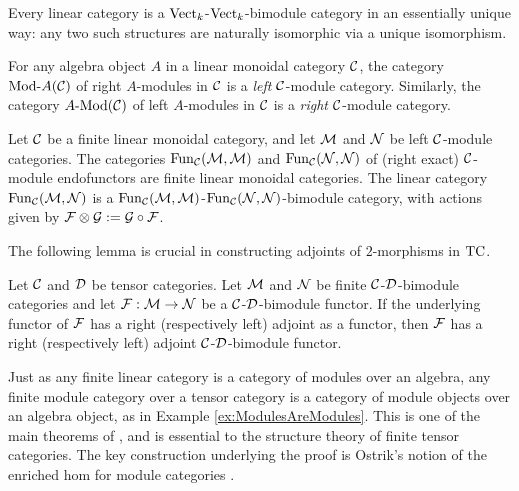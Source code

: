 \documentclass{amsart}
\begin{document}
\begin{example}
	Every linear category is a $\mathrm{Vect}_k$-$\mathrm{Vect}_k$-bimodule category in an essentially unique way: any two such structures are naturally isomorphic via a unique isomorphism.
\end{example} %

\begin{example} \label{ex:ModulesAreModules}
	For any algebra object $A$ in a linear monoidal category $\mathcal C$, the category $\Mod{}{A}(\cC)$ of right $A$-modules in $\mathcal C$ is a \emph{left} $\mathcal C$-module category.  Similarly, the category $\Mod{A}{}(\cC)$ of left $A$-modules in $\mathcal C$ is a \emph{right} $\mathcal C$-module category.
\end{example} %

\begin{example}
	Let $\mathcal C$ be a finite linear monoidal category, and let $\mathcal M$ and $\mathcal N$ be left $\mathcal C$-module categories. The categories $\operatorname{Fun}_{\mathcal C}(\mathcal M, \mathcal M)$ and $\operatorname{Fun}_{\mathcal C}(\mathcal N, \mathcal N)$ of (right exact) $\mathcal C$-module endofunctors are finite linear monoidal categories. The linear category $\operatorname{Fun}_{\mathcal C}(\mathcal M, \mathcal N)$ is a $\operatorname{Fun}_{\mathcal C}(\mathcal M, \mathcal M)$-$\operatorname{Fun}_{\mathcal C}(\mathcal N, \mathcal N)$-bimodule category, with actions given by $\mathcal F \otimes \mathcal G := \mathcal G \circ \mathcal F$. 
\end{example} 

The following lemma is crucial in constructing adjoints of $2$-morphisms in $\mathrm{TC}$.

\begin{lemma} \label{lma:module-adjoint}
Let $\mathcal C$ and $\mathcal D$ be tensor categories. Let  $\mathcal M$ and  $\mathcal N$  be finite $\mathcal C$-$\mathcal D$-bimodule categories and let $\mathcal F: \mathcal M \to \mathcal N$ be a $\mathcal C$-$\mathcal D$-bimodule functor.  If the underlying functor of $\mathcal F$ has a right (respectively left) adjoint as a functor, then $\mathcal F$ has a right (respectively left) adjoint $\mathcal C$-$\mathcal D$-bimodule functor. 
\end{lemma} 


Just as any finite linear category is a category of modules over an algebra, any finite module category over a tensor category is a category of module objects over an algebra object, as in Example \ref{ex:ModulesAreModules}.  This is one of the main theorems of \cite{EGNO}, and is essential to the structure theory of finite tensor categories.  The key construction underlying the proof is Ostrik's notion of the enriched hom for module categories \cite{MR1976459}.  
\end{document}
